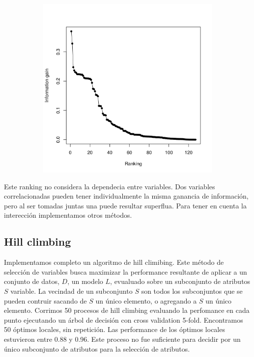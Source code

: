 \documentclass[a4paper,10pt]{article}
\begin{document}
  \begin{figure}[H]
    \centering
    \begin{subfigure}[b]{0.4\textwidth}
      \includegraphics[width=\textwidth]{../imagenes/features_ranking}
     
    \end{subfigure}
      \caption{}
    \label{fig:features_ranking}
  \end{figure}

Este ranking no considera la dependecia entre variables. Dos variables correlacionadas pueden tener individualmente la misma ganancia de informaci\'on, pero al ser tomadas juntas una puede resultar superflua. Para tener en cuenta la interecci\'on implementamos otros m\'etodos. 

\subsection{Hill climbing}

Implementamos completo un algoritmo de hill climibing. Este m\'etodo de selecci\'on de variables busca maximizar la performance resultante de aplicar a un conjunto de datos, $D$, un modelo $L$, evualuado sobre un subconjunto de atributos $S$ variable. La vecindad de un subconjunto $S$ son todos los subconjuntos que se pueden contruir sacando de $S$ un \'unico elemento, o agregando a $S$ un \'unico elemento. Corrimos 50 procesos de hill climbing evaluando la perfomance en cada punto ejecutando un \'arbol de decisi\'on con cross validation 5-fold. Encontramos 50 \'optimos locales, sin repetici\'on. Las performance de los \'optimos locales estuvieron entre 0.88 y 0.96. Este proceso no fue suficiente para decidir por un \'unico subconjunto de atributos para la selecci\'on de atributos. 
\end{document}
